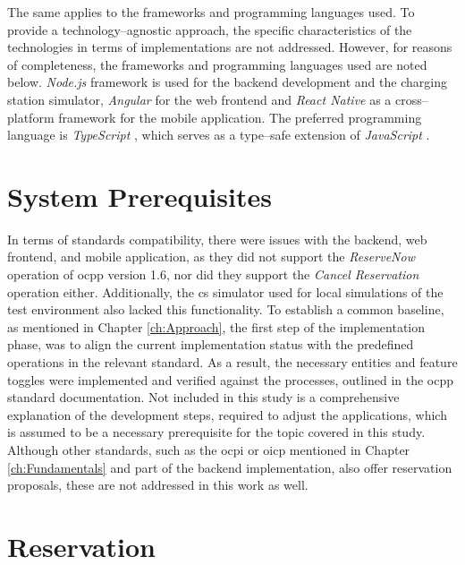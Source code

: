 The same applies to the frameworks and programming languages used. To provide a technology--agnostic approach, the specific characteristics of the technologies in terms of implementations are not addressed.
However, for reasons of completeness, the frameworks and programming languages used are noted below. \textit{Node.js} framework \cite{noauthor_nodejs_nodate} is used for the backend development and the charging station simulator, \textit{Angular} \cite{noauthor_angular_nodate} for the web frontend and \textit{React Native} \cite{noauthor_react_nodate} as a cross--platform framework for the mobile application. The preferred programming language is \textit{TypeScript} \cite{noauthor_javascript_nodate}, which serves as a type--safe extension of \textit{JavaScript} \cite{noauthor_javascript_2023}.

\section{System Prerequisites}
\label{ch:Implementation:sec:System Prerequisites}

In terms of standards compatibility, there were issues with the backend, web frontend, and mobile application, as they did not support the \textit{ReserveNow} operation of \acrshort{ocpp} version 1.6, nor did they support the \textit{Cancel Reservation} operation either.
Additionally, the \acrshort{cs} simulator used for local simulations of the test environment also lacked this functionality.
To establish a common baseline, as mentioned in Chapter \ref{ch:Approach}, the first step of the implementation phase, was to align the current implementation status with the predefined operations in the relevant standard.
As a result, the necessary entities and feature toggles were implemented and verified against the processes, outlined in the \acrshort{ocpp} standard documentation.
Not included in this study is a comprehensive explanation of the development steps, required to adjust the applications, which is assumed to be a necessary prerequisite for the topic covered in this study.
Although other standards, such as the \acrshort{ocpi} or \acrshort{oicp} mentioned in Chapter \ref{ch:Fundamentals} and part of the backend implementation, also offer reservation proposals, these are not addressed in this work as well.

\section{Reservation}
\label{ch:Implementation:sec:Reservation}

